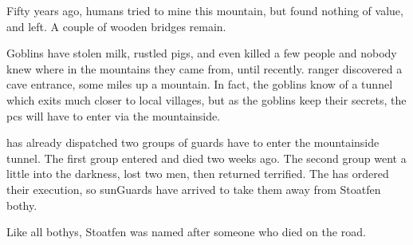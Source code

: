 \begin{multicols}{2}
\noindent
Fifty years ago, humans tried to mine this mountain, but found nothing of value, and left.
A couple of wooden bridges remain.

Goblins have stolen milk, rustled pigs, and even killed a few people and nobody knew where in the mountains they came from, until recently.
 ranger discovered a cave entrance, some miles up a mountain.
In fact, the goblins know of a tunnel which exits much closer to local \glspl{village}, but as the goblins keep their secrets, the \glspl{pc} will have to enter via the mountainside.

 has already dispatched two groups of \glspl{guard} have to enter the mountainside tunnel.
The first group entered and died two weeks ago.
The second group went a little into the darkness, lost two men, then returned terrified.
The  has ordered their execution, so \glspl{sunGuard} have arrived to take them away from Stoatfen \gls{bothy}.%

Like all \glspl{bothy}, Stoatfen was named after someone who died on the road.

\end{multicols}

